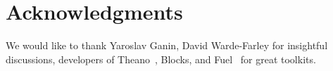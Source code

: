 \documentclass[a4paper]{article}
\begin{document}
\section{Acknowledgments}

We would like to thank Yaroslav Ganin, David Warde-Farley for insightful discussions,
developers of Theano~\citep{theano2016theano}, Blocks, and Fuel~\citep{MerrienboerBDSW15} 
for great toolkits.




\end{document}
